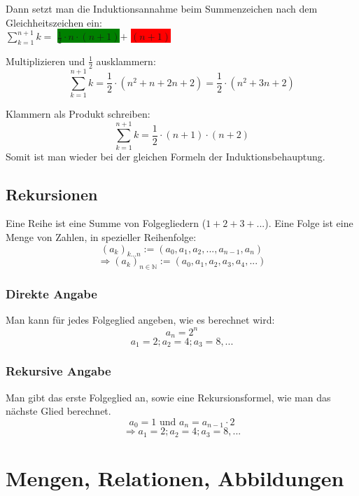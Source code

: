 Dann setzt man die Induktionsannahme beim Summenzeichen nach dem
Gleichheitszeichen ein:
\\ $\sum\limits_{k=1}^{n+1} k = $ \colorbox{green}{$\frac{1}{2} \cdot n \cdot (n + 1)$}$ + $ \colorbox{red}{$ (n + 1) $}

Multiplizieren und $\frac{1}{2}$ ausklammern:
 \[ \sum\limits_{k=1}^{n+1} k = \frac{1}{2} \cdot (n^2 + n + 2n + 2) =
 \frac{1}{2} \cdot (n^2 + 3n + 2) \]

Klammern als Produkt schreiben:
 \[ \sum\limits_{k=1}^{n+1} k = \frac{1}{2} \cdot (n + 1) \cdot (n + 2)\]
Somit ist man wieder bei der gleichen Formeln der Induktionsbehauptung.

\subsection{Rekursionen}
Eine Reihe ist eine Summe von Folgegliedern ($1 + 2 + 3 + ...$). Eine Folge ist eine Menge
von Zahlen, in spezieller Reihenfolge:
\[ (a_k)_{k...n} := (a_0, a_1, a_2, ..., a_{n-1}, a_n) \]
\[ \Rightarrow (a_k)_{n \in \mathbb{N}} := (a_0, a_1, a_2, a_3, a_4, ...) \]
\subsubsection{Direkte Angabe}
Man kann für jedes Folgeglied angeben, wie es berechnet wird:
\[ a_n = 2^n \]
\[ a_1 = 2; a_2 = 4; a_3 = 8, ... \]
\subsubsection{Rekursive Angabe}
Man gibt das erste Folgeglied an, sowie eine Rekursionsformel,
wie man das nächste Glied berechnet.
\[a_0 = 1 \text{ und } a_n = a_{n-1} \cdot 2 \]
\[ \Rightarrow a_1 = 2; a_2 = 4; a_3 = 8, ... \]

\section{Mengen, Relationen, Abbildungen}

